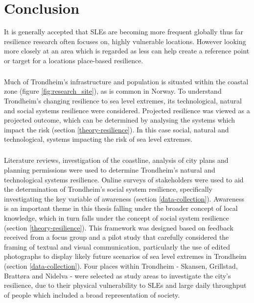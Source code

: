 \chapter{Conclusion}


It is generally accepted that SLEs are becoming more frequent globally thus far resilience research often focuses on, highly vulnerable locations. However looking more closely at an area which is regarded as less can help create a reference point or target for a locations place-based resilience.
\paragraph{}

Much of Trondheim's infrastructure and population is situated within the coastal zone (figure \ref{fig:research_site}), as is common in Norway. To understand Trondheim's changing resilience to sea level extremes, its technological, natural and social systems resilience were considered.  Projected resilience was viewed as a projected outcome, which can be determined by analysing the systems which impact the risk (section \ref{theory-resilience}). In this case social, natural and technological, systems impacting the risk of sea level extremes. 
\paragraph{}

Literature reviews, investigation of the coastline, analysis of city plans and planning permissions were used to determine Trondheim's natural and technological systems resilience. Online surveys of stakeholders were used to aid the determination of Trondheim's social system resilience, specifically investigating the key variable of awareness (section \ref{data-collection}). Awareness is an important theme in this thesis falling under the broader concept of local knowledge, which in turn falls under the concept of social system resilience (section \ref{theory-resilience}). This framework was designed based on feedback received from a focus group and a pilot study that carefully considered the framing of textual and visual communication, particularly the use of edited photographs to display likely future scenarios of sea level extremes in Trondheim (section \ref{data-collection}). Four places within Trondheim - Skansen, Grillstad, Brattøra and Nidelva - were selected as study areas to investigate the city's resilience, due to their physical vulnerability to SLEs and large daily throughput of people which included a broad representation of society.

